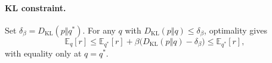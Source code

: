 \paragraph{KL constraint.}
Set $\delta_\beta=D_{\mathrm{KL}}(p\Vert q^*)$.
For any $q$ with $D_{\mathrm{KL}}(p\Vert q)\le\delta_\beta$, optimality gives
\begin{equation}
 \mathbb E_q[r]\le\mathbb E_{q^*}[r]
 +\beta\bigl(D_{\mathrm{KL}}(p\Vert q)-\delta_\beta\bigr)
 \le\mathbb E_{q^*}[r],
 \label{eq:app-reward-constrained}
\end{equation}
with equality only at $q=q^*$.
